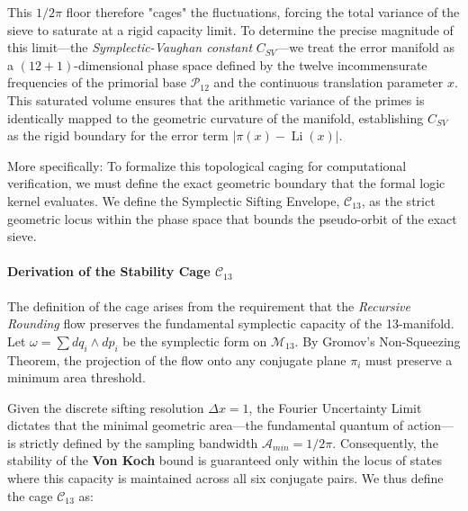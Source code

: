 \documentclass[sn-mathphys-num, pdflatex, referee]{sn-jnl}
\begin{document}
This $1/2\pi$ floor therefore "cages" the fluctuations, forcing the total variance of the sieve to saturate at a rigid capacity limit. To determine the precise magnitude of this limit—the \textit{Symplectic-Vaughan constant} $C_{SV}$—we treat the error manifold as a $(12+1)$-dimensional phase space defined by the twelve incommensurate frequencies of the primorial base $\mathcal{P}_{12}$ and the continuous translation parameter $x$. This saturated volume ensures that the arithmetic variance of the primes is identically mapped to the geometric curvature of the manifold, establishing $C_{SV}$ as the rigid boundary for the error term $|\pi(x) - \operatorname{Li}(x)|$.

More specifically:
To formalize this topological caging for computational verification, we must define the exact geometric boundary that the formal logic kernel evaluates. We define the Symplectic Sifting Envelope, $\mathcal{C}_{13}$, as the strict geometric locus within the phase space that bounds the pseudo-orbit of the exact sieve.

\paragraph{Derivation of the Stability Cage \texorpdfstring{$\mathcal{C}_{13}$}{C13}}

The definition of the cage arises from the requirement that the \textit{Recursive Rounding} flow preserves the fundamental symplectic capacity of the 13-manifold. Let $\omega = \sum dq_i \wedge dp_i$ be the symplectic form on $\mathcal{M}_{13}$. By Gromov's Non-Squeezing Theorem, the projection of the flow onto any conjugate plane $\pi_i$ must preserve a minimum area threshold. 

Given the discrete sifting resolution $\Delta x = 1$, the Fourier Uncertainty Limit dictates that the minimal geometric area---the fundamental quantum of action---is strictly defined by the sampling bandwidth $\mathcal{A}_{min} = 1/2\pi$. Consequently, the stability of the \textbf{Von Koch} bound is guaranteed only within the locus of states where this capacity is maintained across all six conjugate pairs. We thus define the cage $\mathcal{C}_{13}$ as:
\end{document}
